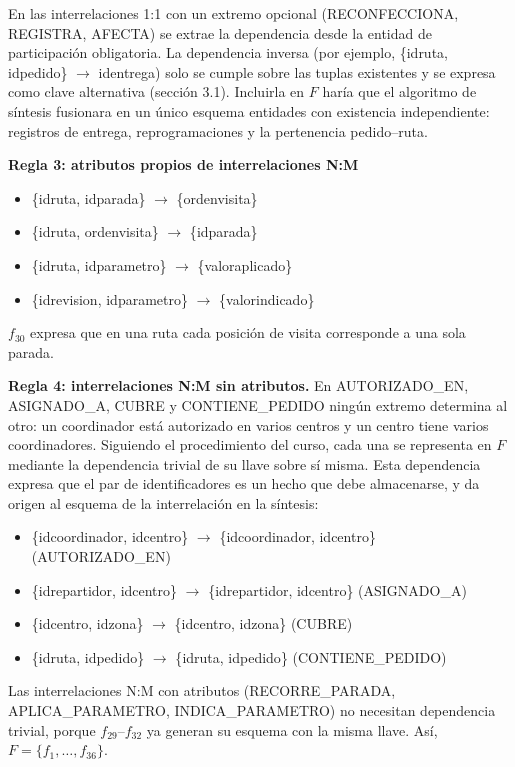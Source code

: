\documentclass[11pt,a4paper]{article}
\newcommand{\ubrk}{\textunderscore\allowbreak}
\newcommand{\campo}[1]{\textnormal{\ttfamily\let\_\ubrk #1}}
\newcommand{\df}[3]{\item[$f_{#1}$:] \{#2\} $\rightarrow$ \{#3\}}
\begin{document}
En las interrelaciones 1:1 con un extremo opcional (RECONFECCIONA, REGISTRA, AFECTA) se extrae la dependencia desde la entidad de participación obligatoria. La dependencia inversa (por ejemplo, \{\campo{id\_ruta}, \campo{id\_pedido}\} $\rightarrow$ \campo{id\_entrega}) solo se cumple sobre las tuplas existentes y se expresa como clave alternativa (sección 3.1). Incluirla en $F$ haría que el algoritmo de síntesis fusionara en un único esquema entidades con existencia independiente: registros de entrega, reprogramaciones y la pertenencia pedido--ruta.

\textbf{Regla 3: atributos propios de interrelaciones N:M}
{\raggedright
\begin{itemize}[leftmargin=1.2cm,labelwidth=1cm,align=left]
\df{29}{\campo{id\_ruta}, \campo{id\_parada}}{\campo{orden\_visita}}
\df{30}{\campo{id\_ruta}, \campo{orden\_visita}}{\campo{id\_parada}}
\df{31}{\campo{id\_ruta}, \campo{id\_parametro}}{\campo{valor\_aplicado}}
\df{32}{\campo{id\_revision}, \campo{id\_parametro}}{\campo{valor\_indicado}}
\end{itemize}
\par}

$f_{30}$ expresa que en una ruta cada posición de visita corresponde a una sola parada.

\textbf{Regla 4: interrelaciones N:M sin atributos.} En AUTORIZADO\_EN, ASIGNADO\_A, CUBRE y CONTIENE\_PEDIDO ningún extremo determina al otro: un coordinador está autorizado en varios centros y un centro tiene varios coordinadores. Siguiendo el procedimiento del curso, cada una se representa en $F$ mediante la dependencia trivial de su llave sobre sí misma. Esta dependencia expresa que el par de identificadores es un hecho que debe almacenarse, y da origen al esquema de la interrelación en la síntesis:
{\raggedright
\begin{itemize}[leftmargin=1.2cm,labelwidth=1cm,align=left]
\df{33}{\campo{id\_coordinador}, \campo{id\_centro}}{\campo{id\_coordinador}, \campo{id\_centro}} \hfill (AUTORIZADO\_EN)
\df{34}{\campo{id\_repartidor}, \campo{id\_centro}}{\campo{id\_repartidor}, \campo{id\_centro}} \hfill (ASIGNADO\_A)
\df{35}{\campo{id\_centro}, \campo{id\_zona}}{\campo{id\_centro}, \campo{id\_zona}} \hfill (CUBRE)
\df{36}{\campo{id\_ruta}, \campo{id\_pedido}}{\campo{id\_ruta}, \campo{id\_pedido}} \hfill (CONTIENE\_PEDIDO)
\end{itemize}
\par}
Las interrelaciones N:M con atributos (RECORRE\_PARADA, APLICA\_PARAMETRO, INDICA\_PARAMETRO) no necesitan dependencia trivial, porque $f_{29}$--$f_{32}$ ya generan su esquema con la misma llave. Así, $F = \{f_1, \dots, f_{36}\}$.
\end{document}
